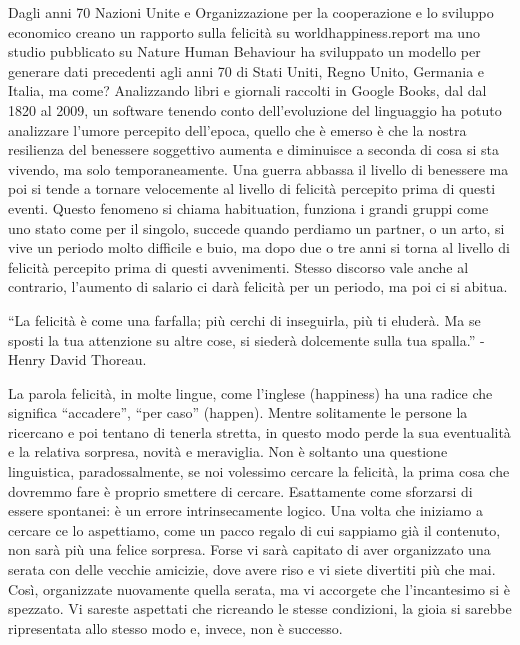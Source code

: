 \documentclass[12pt]{book} %
\begin{document}
Dagli anni 70 Nazioni Unite e Organizzazione per la cooperazione e lo sviluppo economico creano un rapporto sulla
felicità su worldhappiness.report ma uno studio pubblicato su Nature Human
Behaviour ha sviluppato un modello per generare dati
precedenti agli anni 70 di Stati Uniti, Regno Unito, Germania e Italia, ma come? Analizzando libri e giornali raccolti
in Google Books, dal dal 1820 al 2009, un software tenendo conto dell'evoluzione del linguaggio ha
potuto analizzare l'umore percepito dell'epoca, quello che è emerso è che la
nostra resilienza del benessere soggettivo aumenta e diminuisce a seconda di cosa si sta vivendo, ma solo
temporaneamente. Una guerra abbassa il livello di benessere ma poi si tende a tornare velocemente al livello di
felicità percepito prima di questi eventi. Questo fenomeno si chiama habituation, funziona i grandi gruppi come uno
stato come per il singolo, succede quando perdiamo un partner, o un arto, si vive un periodo molto difficile e buio, ma
dopo due o tre anni si torna al livello di felicità percepito prima di questi avvenimenti. Stesso discorso vale anche
al contrario, l'aumento di salario ci darà felicità per un periodo, ma poi ci si
abitua.


\bigskip

“La felicità è come una farfalla; più cerchi di inseguirla, più ti eluderà. Ma se sposti la tua attenzione su altre
cose, si siederà dolcemente sulla tua spalla.” - Henry David Thoreau.

La parola felicità, in molte lingue, come l'inglese (happiness) ha una radice che significa
“accadere”, “per caso” (happen). Mentre solitamente le persone la ricercano e poi tentano di tenerla stretta, in questo
modo perde la sua eventualità e la relativa sorpresa, novità e meraviglia. Non è soltanto una questione linguistica,
paradossalmente, se noi volessimo cercare la felicità, la prima cosa che dovremmo fare è proprio smettere di cercare.
Esattamente come sforzarsi di essere spontanei: è un errore intrinsecamente logico. Una volta che iniziamo a cercare ce
lo aspettiamo, come un pacco regalo di cui sappiamo già il contenuto, non sarà più una felice sorpresa. Forse vi sarà
capitato di aver organizzato una serata con delle vecchie amicizie, dove avere riso e vi siete divertiti più che mai.
Così, organizzate nuovamente quella serata, ma vi accorgete che l'incantesimo si è spezzato. Vi
sareste aspettati che ricreando le stesse condizioni, la gioia si sarebbe ripresentata allo stesso modo e, invece, non
è successo. 
\end{document}
